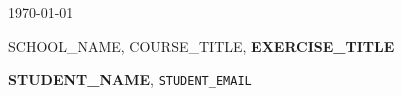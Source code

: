 \documentclass{article}
\begin{document}
\today \par
\vspace{.5cm}
\noindent SCHOOL_NAME, COURSE_TITLE, \textbf{EXERCISE_TITLE} \par
\noindent \textbf{STUDENT_NAME}, \texttt{STUDENT_EMAIL}\par

\section{}
\subsection{}

\end{document}
